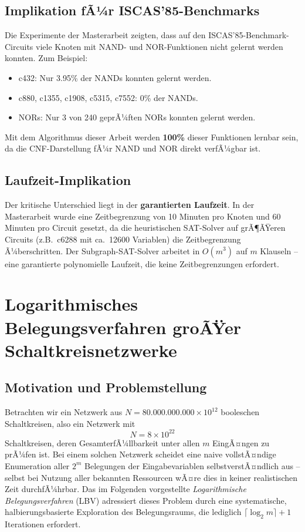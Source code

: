 ﻿\documentclass[a4paper,12pt]{article}
\theoremstyle{definition}
\begin{document}
\subsection{Implikation fÃ¼r ISCAS'85-Benchmarks}

Die Experimente der Masterarbeit zeigten, dass auf den ISCAS'85-Benchmark-Circuits viele Knoten mit NAND- und NOR-Funktionen nicht gelernt werden konnten. Zum Beispiel:
\begin{itemize}
    \item[-] c432: Nur 3.95\% der NANDs konnten gelernt werden.
    \item[-] c880, c1355, c1908, c5315, c7552: 0\% der NANDs.
    \item[-] NORs: Nur 3 von 240 geprÃ¼ften NORs konnten gelernt werden.
\end{itemize}

Mit dem Algorithmus dieser Arbeit werden \textbf{100\%} dieser Funktionen lernbar sein, da die CNF-Darstellung fÃ¼r NAND und NOR direkt verfÃ¼gbar ist.

\subsection{Laufzeit-Implikation}

Der kritische Unterschied liegt in der \textbf{garantierten Laufzeit}. In der Masterarbeit wurde eine Zeitbegrenzung von 10 Minuten pro Knoten und 60 Minuten pro Circuit gesetzt, da die heuristischen SAT-Solver auf grÃ¶ÃŸeren Circuits (z.B.\ c6288 mit ca.\ 12600 Variablen) die Zeitbegrenzung Ã¼berschritten. Der Subgraph-SAT-Solver arbeitet in $O(m^3)$ auf $m$ Klauseln -- eine garantierte polynomielle Laufzeit, die keine Zeitbegrenzungen erfordert.

\section{Logarithmisches Belegungsverfahren groÃŸer Schaltkreisnetzwerke}
\label{sec:log-verfahren}

\subsection{Motivation und Problemstellung}

Betrachten wir ein Netzwerk aus $N = 80.000.000.000 \times 10^{12}$ booleschen Schaltkreisen,
also ein Netzwerk mit
\[
N = 8 \times 10^{22}
\]
Schaltkreisen, deren GesamterfÃ¼llbarkeit unter allen $m$ EingÃ¤ngen zu prÃ¼fen ist. Bei einem
solchen Netzwerk scheidet eine naive vollstÃ¤ndige Enumeration aller $2^m$ Belegungen der
Eingabevariablen selbstverstÃ¤ndlich aus -- selbst bei Nutzung aller bekannten
Ressourcen wÃ¤re dies in keiner realistischen Zeit durchfÃ¼hrbar. Das im Folgenden vorgestellte
\textit{Logarithmische Belegungsverfahren} (LBV) adressiert dieses Problem durch eine
systematische, halbierungsbasierte Exploration des Belegungsraums, die lediglich
$\lceil \log_2 m \rceil + 1$ Iterationen erfordert.
\end{document}
